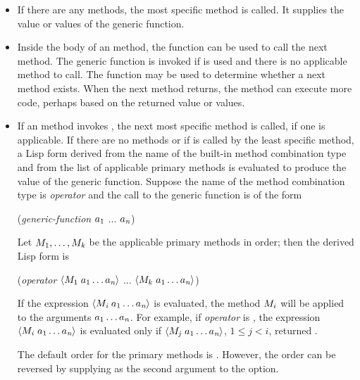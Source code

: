 \begin{itemize}
\item 
If there are any  methods, the most specific 
method is called.   It supplies the value or values of the generic function. 

\item  Inside the body of an  method, the function
 can be used to call the next method.  The
generic function  is invoked if 
 is used and there is no applicable method to call.
The function  may be used to determine whether a
next method exists. When the next method returns, the 
method can execute more code, perhaps based on the returned value or
values.

\item  If an  method invokes 
, the next most specific  method is
called, if one is applicable.  If there are no  methods
or if  is called by the least specific 
 method, a Lisp form derived from the name of the built-in
method combination type and from the list of applicable primary
methods is evaluated to produce the value of the generic function.
Suppose the name of the method combination type is \emph{operator\/}
and the call to the generic function is of the form
\begin{lisp}
(\emph{generic-function\/} $a_ 1$ ... $a_ {\hbox{\scriptsize\it n}}$)
\end{lisp}
Let $M_ 1,\ldots,M_ {\hbox{\scriptsize\it k}}$ be the applicable primary methods
in order; then the derived Lisp form is
\begin{lisp}
(\emph{operator\/} $\langle M_ 1\;a_ 1\ldots a_ {\hbox{\scriptsize\it n}}\rangle$
... $\langle M_ k\;a_ 1\ldots a_ {\hbox{\scriptsize\it n}}\rangle$)
\end{lisp}
If the expression $\langle M_ {\hbox{\scriptsize\it i}} \;a_ 1\ldots a_
{\hbox{\scriptsize\it n}}\rangle$ is
evaluated, the method $M_ i$ will be applied to the arguments
$a_ 1\ldots a_ {\hbox{\scriptsize\it n}}$.  
For example,
if \emph{operator\/} is ,
the expression $\langle M_{\hbox{\scriptsize\it i}} \ a_ 1\ldots a_ {\hbox{\scriptsize\it n}}\rangle$ is
evaluated only if $\langle M\sub {\hbox{\scriptsize\it j}} \ a\sub 1\ldots a\sub {\hbox{\scriptsize\it n}}\rangle$,
$1\leq j<i$, returned .

The default order for the primary methods is 
.  However, the order can be reversed by supplying
 as the second argument to the 
 option.

\end{itemize}


